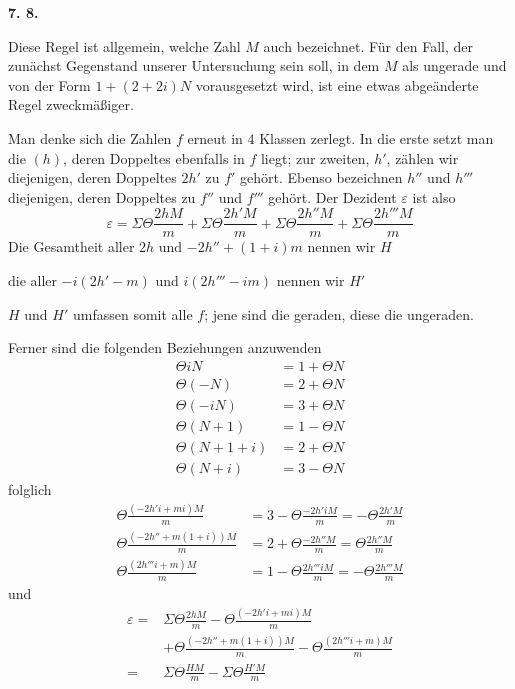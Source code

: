 \par\medskip{}\centerline{\textbf{7. 8.}}\nobreak\smallskip
Diese Regel ist allgemein, welche Zahl $M$ auch bezeichnet. Für den Fall, der zunächst Gegenstand unserer Untersuchung sein soll, in dem $M$ als ungerade und von der Form $1+(2+2i)N$ vorausgesetzt wird, ist eine etwas abgeänderte Regel zweckmäßiger.

Man denke sich die Zahlen $f$ erneut in $4$ Klassen zerlegt. In die erste setzt man die $(h)$, deren Doppeltes ebenfalls in $f$ liegt; zur zweiten, $h'$, zählen wir diejenigen, deren Doppeltes $2h'$ zu $f'$ gehört. Ebenso bezeichnen $h''$ und $h'''$ diejenigen, deren Doppeltes zu $f''$ und $f'''$ gehört. Der Dezident $\varepsilon$ ist also
\[
\varepsilon=\Sigma\Theta\frac{2hM}{m}+\Sigma\Theta\frac{2h'M}{m}+\Sigma\Theta\frac{2h''M}{m}+\Sigma\Theta\frac{2h'''M}{m}
\]
Die Gesamtheit aller $2h$ und $-2h''+(1+i)m$ nennen wir $H$

die aller $-i(2h'-m)$ und $i(2h'''-im)$ nennen wir $H'$

$H$ und $H'$ umfassen somit alle $f$; jene sind die geraden, diese die ungeraden.

Ferner sind die folgenden Beziehungen anzuwenden
\[
\begin{aligned}
\Theta iN&=1+\Theta N\\
\Theta(-N)&=2+\Theta N\\
\Theta(-iN)&=3+\Theta N\\
\Theta(N+1)&=1-\Theta N\\
\Theta(N+1+i)&=2+\Theta N\\
\Theta(N+i)&=3-\Theta N
\end{aligned}
\]
folglich
\[
\begin{aligned}
\Theta\frac{(-2h'i+mi)M}{m}&=3-\Theta\frac{-2h'iM}{m}=-\Theta\frac{2h'M}{m}\\
\Theta\frac{(-2h''+m(1+i))M}{m}&=2+\Theta\frac{-2h''M}{m}=\Theta\frac{2h''M}{m}\\
\Theta\frac{(2h'''i+m)M}{m}&=1-\Theta\frac{2h'''iM}{m}=-\Theta\frac{2h'''M}{m}
\end{aligned}
\]
und
\[
\begin{aligned}
\varepsilon={}&\Sigma\Theta\frac{2hM}{m}-\Theta\frac{(-2h'i+mi)M}{m}\\
&+\Theta\frac{(-2h''+m(1+i))M}{m}-\Theta\frac{(2h'''i+m)M}{m}\\
={}&\Sigma\Theta\frac{HM}{m}-\Sigma\Theta\frac{H'M}{m}
\end{aligned}
\]

